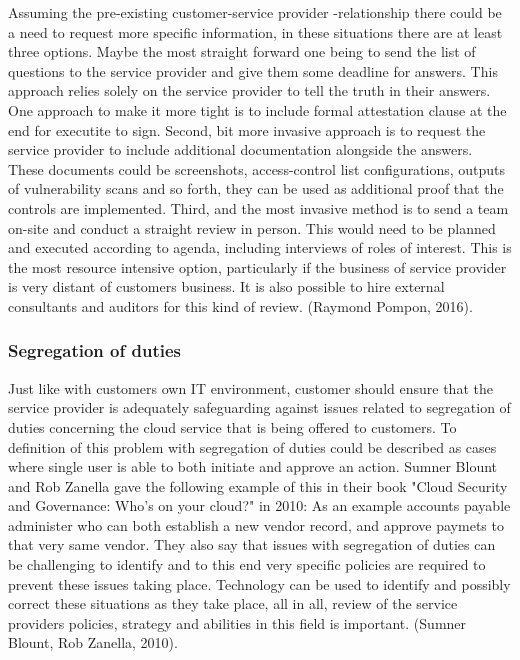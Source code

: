 \documentclass{article}
\begin{document}
Assuming the pre-existing customer-service provider -relationship there could be a need to request more specific information, in these situations there are at least three options. Maybe the most straight forward one being to send the list of questions to the service provider and give them some deadline for answers. This approach relies solely on the service provider to tell the truth in their answers. One approach to make it more tight is to include formal attestation clause at the end for executite to sign. Second, bit more invasive approach is to request the service provider to include additional documentation alongside the answers. These documents could be screenshots, access-control list configurations, outputs of vulnerability scans and so forth, they can be used as additional proof that the controls are implemented. Third, and the most invasive method is to send a team on-site and conduct a straight review in person. This would need to be planned and executed according to agenda, including interviews of roles of interest. This is the most resource intensive option, particularly if the business of service provider is very distant of customers business. It is also possible to hire external consultants and auditors for this kind of review. (Raymond Pompon, 2016). 
\subsubsection{Segregation of duties}
Just like with customers own IT environment, customer should ensure that the service provider is adequately safeguarding against issues related to segregation of duties concerning the cloud service that is being offered to customers.
To definition of this problem with segregation of duties could be described as cases where single user is able to both initiate and approve an action. Sumner Blount and Rob Zanella gave the following example of this in their book "Cloud Security and Governance: Who's on your cloud?" in 2010: As an example accounts payable administer who can both establish a new vendor record, and approve paymets to that very same vendor. They also say that issues with segregation of duties can be challenging to identify and to this end very specific policies are required to prevent these issues taking place. Technology can be used to identify and possibly correct these situations as they take place, all in all, review of the service providers policies, strategy and abilities in this field is important. (Sumner Blount, Rob Zanella, 2010). 
\end{document}
